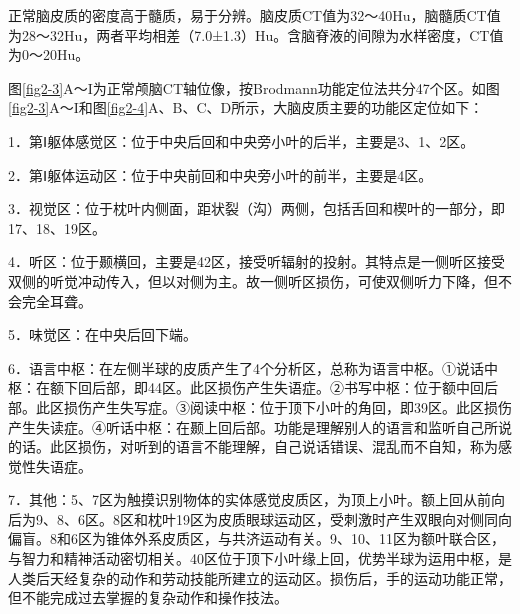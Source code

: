 正常脑皮质的密度高于髓质，易于分辨。脑皮质CT值为32～40Hu，脑髓质CT值为28～32Hu，两者平均相差（7.0±1.3）Hu。含脑脊液的间隙为水样密度，CT值为0～20Hu。

图\ref{fig2-3}A～I为正常颅脑CT轴位像，按Brodmann功能定位法共分47个区。如图\ref{fig2-3}A～I和图\ref{fig2-4}A、B、C、D所示，大脑皮质主要的功能区定位如下：

1．第Ⅰ躯体感觉区：位于中央后回和中央旁小叶的后半，主要是3、1、2区。

2．第Ⅰ躯体运动区：位于中央前回和中央旁小叶的前半，主要是4区。

3．视觉区：位于枕叶内侧面，距状裂（沟）两侧，包括舌回和楔叶的一部分，即17、18、19区。

4．听区：位于颞横回，主要是42区，接受听辐射的投射。其特点是一侧听区接受双侧的听觉冲动传入，但以对侧为主。故一侧听区损伤，可使双侧听力下降，但不会完全耳聋。

5．味觉区：在中央后回下端。

6．语言中枢：在左侧半球的皮质产生了4个分析区，总称为语言中枢。①说话中枢：在额下回后部，即44区。此区损伤产生失语症。②书写中枢：位于额中回后部。此区损伤产生失写症。③阅读中枢：位于顶下小叶的角回，即39区。此区损伤产生失读症。④听话中枢：在颞上回后部。功能是理解别人的语言和监听自己所说的话。此区损伤，对听到的语言不能理解，自己说话错误、混乱而不自知，称为感觉性失语症。

7．其他：5、7区为触摸识别物体的实体感觉皮质区，为顶上小叶。额上回从前向后为9、8、6区。8区和枕叶19区为皮质眼球运动区，受刺激时产生双眼向对侧同向偏盲。8和6区为锥体外系皮质区，与共济运动有关。9、10、11区为额叶联合区，与智力和精神活动密切相关。40区位于顶下小叶缘上回，优势半球为运用中枢，是人类后天经复杂的动作和劳动技能所建立的运动区。损伤后，手的运动功能正常，但不能完成过去掌握的复杂动作和操作技法。


